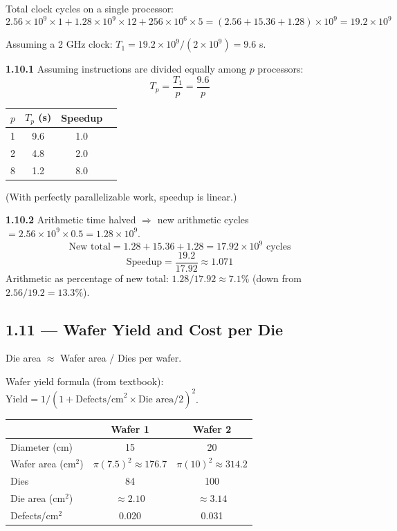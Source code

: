 Total clock cycles on a single processor:
\[
  2.56 \times 10^9 \times 1 + 1.28 \times 10^9 \times 12
  + 256 \times 10^6 \times 5
  = (2.56 + 15.36 + 1.28) \times 10^9
  = 19.2 \times 10^9
\]

Assuming a 2 GHz clock: $T_1 = 19.2 \times 10^9 / (2 \times 10^9) = 9.6$ s.

\medskip\noindent\textbf{1.10.1}
Assuming instructions are divided equally among $p$ processors:
\[
  T_p = \frac{T_1}{p} = \frac{9.6}{p}
\]

\begin{center}
\begin{tabular}{lccc}
\toprule
$p$ & $T_p$ (s) & Speedup \\
\midrule
1 & 9.6  & 1.0 \\
2 & 4.8  & 2.0 \\
8 & 1.2  & 8.0 \\
\bottomrule
\end{tabular}
\end{center}

(With perfectly parallelizable work, speedup is linear.)

\medskip\noindent\textbf{1.10.2}
Arithmetic time halved $\Rightarrow$ new arithmetic cycles
$= 2.56 \times 10^9 \times 0.5 = 1.28 \times 10^9$.
\[
  \text{New total} = 1.28 + 15.36 + 1.28 = 17.92 \times 10^9 \text{ cycles}
\]
\[
  \text{Speedup} = \frac{19.2}{17.92} \approx 1.071
\]
Arithmetic as percentage of new total:
$1.28 / 17.92 \approx 7.1\%$ (down from $2.56/19.2 = 13.3\%$).

\subsection*{1.11 --- Wafer Yield and Cost per Die}
\hypertarget{sol-1.11}{}

Die area $\approx$ Wafer area / Dies per wafer.

Wafer yield formula (from textbook):
$\text{Yield} = 1 / (1 + \text{Defects/cm}^2 \times \text{Die area}/2)^2$.

\begin{center}
\begin{tabular}{lcc}
\toprule
& Wafer 1 & Wafer 2 \\
\midrule
Diameter (cm) & 15 & 20 \\
Wafer area (cm$^2$) & $\pi(7.5)^2 \approx 176.7$ & $\pi(10)^2 \approx 314.2$ \\
Dies & 84 & 100 \\
Die area (cm$^2$) & $\approx 2.10$ & $\approx 3.14$ \\
Defects/cm$^2$ & 0.020 & 0.031 \\
\bottomrule
\end{tabular}
\end{center}

